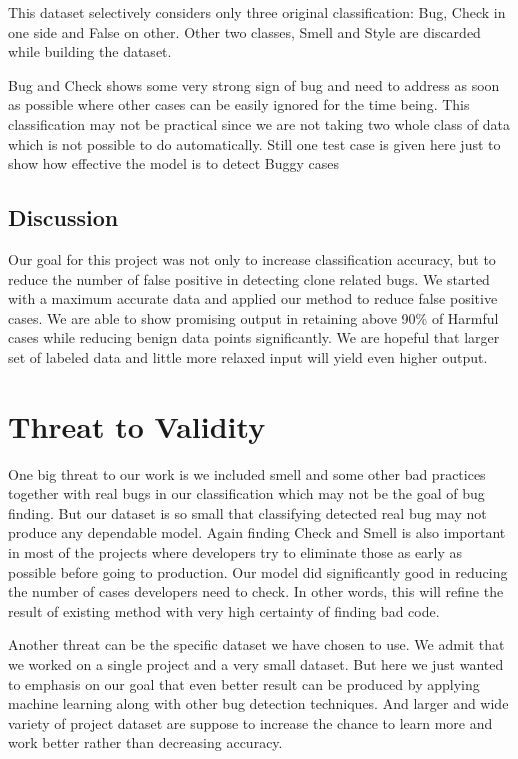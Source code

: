 \documentclass[11pt]{article}
\begin{document}
\noindent
This dataset selectively considers only three original classification: Bug, Check in one side and False on other. Other two classes, Smell and Style are discarded while building the dataset.

\noindent
Bug and Check shows some very strong sign of bug and need to address as soon as possible where other cases can be easily ignored for the time being. This classification may not be practical since we are not taking two whole class of data which is not possible to do automatically. Still one test case is given here just to show how effective the model is to detect Buggy cases

\subsection{Discussion}
Our goal for this project was not only to increase classification accuracy, but to reduce the number of false positive in detecting clone related bugs. We started with a maximum accurate data and applied our method to reduce false positive cases. We are able to show promising output in retaining above 90\% of Harmful cases while reducing benign data points significantly. We are hopeful that larger set of labeled data and little more relaxed input will yield even higher output.

\section{Threat to Validity}
One big threat to our work is we included smell and some other bad practices together with real bugs in our classification which may not be the goal of bug finding. But our dataset is so small that classifying detected real bug may not produce any dependable model. Again finding Check and Smell is also important in most of the projects where developers try to eliminate those as early as possible before going to production. Our model did significantly good in reducing the number of cases developers need to check. In other words, this will refine the result of existing method with very high certainty of finding bad code.

\vspace{10pt}
\noindent
Another threat can be the specific dataset we have chosen to use. We admit that we worked on a single project and a very small dataset. But here we just wanted to emphasis on our goal that even better result can be produced by applying machine learning along with other bug detection techniques. And larger and wide variety of project dataset are suppose to increase the chance to learn more and work better rather than decreasing accuracy.
\end{document}
